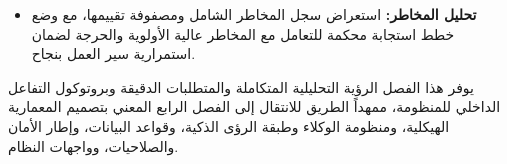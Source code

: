 {\begin{itemize}
    \item \textbf{تحليل المخاطر:} استعراض سجل المخاطر الشامل ومصفوفة تقييمها، مع وضع خطط استجابة محكمة للتعامل مع المخاطر عالية الأولوية والحرجة لضمان استمرارية سير العمل بنجاح.
\end{itemize}

يوفر هذا الفصل الرؤية التحليلية المتكاملة والمتطلبات الدقيقة وبروتوكول التفاعل الداخلي للمنظومة، ممهداً الطريق للانتقال إلى الفصل الرابع المعني بتصميم المعمارية الهيكلية، ومنظومة الوكلاء وطبقة الرؤى الذكية، وقواعد البيانات، وإطار الأمان والصلاحيات، وواجهات النظام.
}
